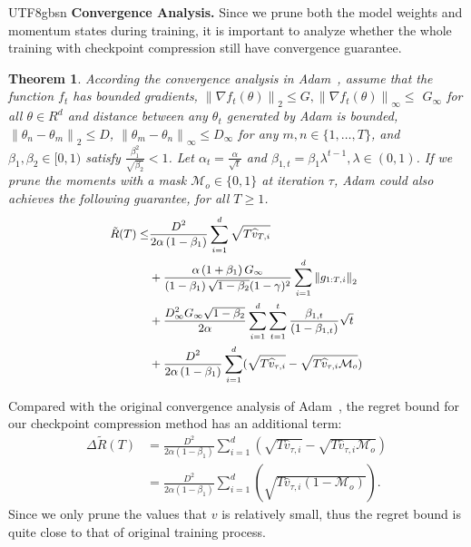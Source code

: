 \documentclass{article}
\theoremstyle{plain}
\newtheorem{theorem}{Theorem}[section]
\theoremstyle{definition}
\theoremstyle{remark}
\begin{document}
\begin{CJK}{UTF8}{gbsn}
\textbf{Convergence Analysis.} Since we prune both the model weights and momentum states during training, it is important to analyze whether the whole training with checkpoint compression still have convergence guarantee.

\begin{theorem}\label{theorem}
	According the convergence analysis in Adam~\cite{kingma2014adam}, assume that the function $f_t$ has bounded gradients, $\left\|\nabla f_t(\theta)\right\|_2 \leq G,\left\|\nabla f_t(\theta)\right\|_{\infty} \leq$ $G_{\infty}$ for all $\theta \in R^d$ and distance between any $\theta_t$ generated by Adam is bounded, $\left\|\theta_n-\theta_m\right\|_2 \leq D$, $\left\|\theta_m-\theta_n\right\|_{\infty} \leq D_{\infty}$ for any $m, n \in\{1, \ldots, T\}$, and $\beta_1, \beta_2 \in[0,1)$ satisfy $\frac{\beta_1^2}{\sqrt{\beta_2}}<1$. Let $\alpha_t=\frac{\alpha}{\sqrt{t}}$ and $\beta_{1, t}=\beta_1 \lambda^{t-1}, \lambda \in(0,1)$. If we prune the moments with a mask $\mathcal{M}_o\in \{0,1\}$ at iteration $\tau$, 
	Adam could also achieves the following guarantee, for all $T \geq 1$.
	\begin{equation}
		\small
		\begin{aligned}\label{bound}
			\tilde R(T) 
			\leq & \frac{D^2}{2 \alpha\left(1-\beta_1\right)} \sum_{i=1}^d \sqrt{T \widehat{v}_{T, i}}\\
			&+\frac{\alpha\left(1+\beta_1\right) G_{\infty}}{\left(1-\beta_1\right) \sqrt{1-\beta_2}(1-\gamma)^2} \sum_{i=1}^d\left\|g_{1: T, i}\right\|_2 \\
			&+\frac{D_{\infty}^2 G_{\infty} \sqrt{1-\beta_2}}{2 \alpha} \sum_{i=1}^d \sum_{t=1}^t \frac{\beta_{1, t}}{\left(1-\beta_{1, t}\right)} \sqrt{t}\\
			& +\frac{D^2}{2 \alpha\left(1-\beta_1\right)} \sum_{i=1}^d (\sqrt{T \widehat{v}_{\tau, i}} - \sqrt{T \widehat{v}_{\tau, i}\mathcal{M}_o})
		\end{aligned}
	\end{equation}
\end{theorem}
Compared with the original convergence analysis of Adam~\cite{kingma2014adam}, the regret bound for our checkpoint compression method has an additional term:
\begin{equation}
	\begin{aligned}
		\Delta\tilde R(T)& = \frac{D^2}{2 \alpha\left(1-\beta_1\right)} \sum_{i=1}^d (\sqrt{T \widehat{v}_{\tau, i}} - \sqrt{T \widehat{v}_{\tau, i}\mathcal{M}_o})\\
		&= \frac{D^2}{2 \alpha\left(1-\beta_1\right)} \sum_{i=1}^d (\sqrt{T \widehat{v}_{\tau, i}(1-\mathcal{M}_o)} ). 
	\end{aligned}
\end{equation}
Since we only prune the values that $v$ is relatively small, thus the regret bound is quite close to that of original training process.


\end{CJK}
\end{document}
